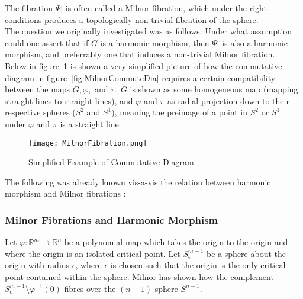 \documentclass[12pt]{article}
\theoremstyle{definition}
\numberwithin{equation}{subsection}
\begin{document}
\begin{center}
\end{center}

The fibration $\Psi|$ is often called a Milnor fibration, which under the right conditions produces a topologically non-trivial fibration of the sphere.\\ 
The question we originally investigated was as follows: Under what assumption could one assert that if $G$ is a harmonic morphism, then $\Psi|$ is also a harmonic morphism, and preferrably one that induces a non-trivial Milnor fibration.\\
Below in figure~\ref{fig:ExampleCommuteDia} is shown a very simplified picture of how the commutative diagram in  figure~\ref{fig:MilnorCommuteDia} requires a certain compatibility between the maps $G, \varphi,$ and $\pi$. $G$ is shown as some homogeneous map (mapping straight lines to straight lines), and $\varphi$ and $\pi$ as radial projection down to their respective spheres ($S^2$ and $S^1$), meaning the preimage of a point in $S^2$ or $S^1$ under $\varphi$ and $\pi$ is a straight line. \\

    \begin{figure}[H]
    \centering
    \texttt{[image: MilnorFibration.png]}
    \caption{Simplified Example of Commutative Diagram}
    \label{fig:ExampleCommuteDia}
    \end{figure}



The following was already known vis-a-vis the relation between harmonic morphism and Milnor fibrations \cite{BairdOu}:
\subsubsection{Milnor Fibrations and Harmonic Morphism}
Let $\varphi: \mathbb{R}^m \rightarrow \mathbb{R}^n$ be a polynomial map which takes the origin to the origin and where the origin is an isolated critical point. Let $S^{m-1}_\epsilon$ be a sphere about the origin with radius $\epsilon$, where $\epsilon$ is chosen such that the origin is the only critical point contained within the sphere. Milnor has shown how the complement $S^{m-1}_\epsilon \setminus \varphi^{-1}(0)$ fibres over the $(n-1)$-sphere $S^{n-1}$.
\end{document}
